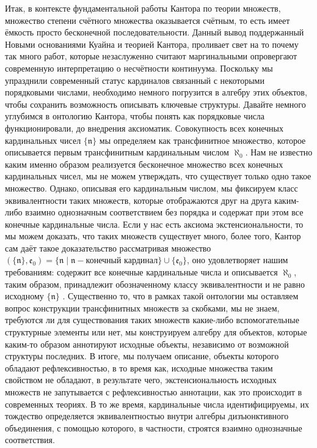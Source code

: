 \documentclass[12pt]{article}
\begin{document}
Итак, в контексте фундаментальной работы Кантора по теории множеств, множество степени счётного множества оказывается счётным, то есть имеет ёмкость просто бесконечной последовательности. Данный вывод поддержанный Новыми основаниями Куайна и теорией Кантора, проливает свет на то почему так много работ, которые незаслуженно считают маргинальными опровергают современную интерпретацию о несчётности континуума. Поскольку мы упразднили современный статус кардиналов связанный с некоторыми порядковыми числами, необходимо немного погрузится в алгебру этих объектов, чтобы сохранить возможность описывать ключевые структуры. Давайте немного углубимся в онтологию Кантора, чтобы понять как порядковые числа функционировали, до внедрения аксиоматик. Совокупность всех конечных кардинальных чисел $\{ \mathfrak{n} \}$ мы определяем как трансфинитное множество, которое описывается первым трансфинитным кардинальным числом $\aleph_0$. Нам не известно каким именно образом реализуется бесконечное множество всех конечных кардинальных чисел, мы не можем утверждать, что существует только одно такое множество. Однако, описывая его кардинальным числом, мы фиксируем класс эквивалентности таких множеств, которые отображаются друг на друга каким-либо взаимно однозначным соответствием без порядка и содержат при этом все конечные кардинальные числа. Если у нас есть аксиома экстенсиональности, то мы можем доказать, что таких множеств существует много, более того, Кантор сам даёт такое доказательство рассматривая множество $(\{ \mathfrak{n} \}, \mathfrak{e}_0) = \{ \mathfrak{n} \mid \mathfrak{n} - \text{конечный кардинал} \} \cup \{ \mathfrak{e}_0 \}$, оно удовлетворяет нашим требованиям: содержит все конечные кардинальные числа и описывается $\aleph_0$, таким образом, принадлежит обозначенному классу эквивалентности и не равно исходному $\{ \mathfrak{n} \}$ \cite{cantor-aleph-zero}. Существенно то, что в рамках такой онтологии мы оставляем вопрос конструкции трансфинитных множеств за скобками, мы не знаем, требуются ли для существования таких множеств какие-либо вспомогательные структурные элементы или нет, мы конструируем алгебру для объектов, которые каким-то образом аннотируют исходные объекты, независимо от возможной структуры последних. В итоге, мы получаем описание, объекты которого обладают рефлексивностью, в то время как, исходные множества таким свойством не обладают, в результате чего, экстенсиональность исходных множеств не запутывается с рефлексивностью аннотации, как это происходит в современных теориях. В то же время, кардинальные числа идентифицируемы, их тождество определяется эквивалентностью внутри алгебры дизъюнктивного объединения, с помощью которого, в частности, строятся взаимно однозначные соответствия.
\end{document}
